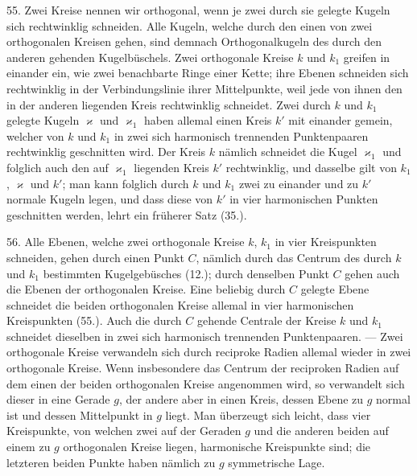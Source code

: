 55. Zwei Kreise nennen wir {\glqq}orthogonal{\grqq}, wenn je zwei
durch sie gelegte Kugeln sich rechtwinklig schneiden. Alle
Kugeln, welche durch den einen von zwei orthogonalen
Kreisen gehen, sind demnach Orthogonalkugeln des durch
den anderen gehenden Kugelb\"uschels. Zwei orthogonale
Kreise $k$ und $k_1$ greifen in einander ein, wie zwei benachbarte
Ringe einer Kette; ihre Ebenen schneiden sich rechtwinklig
in der Verbindungslinie ihrer Mittelpunkte, weil jede
von ihnen den in der anderen liegenden Kreis rechtwinklig
schneidet. Zwei durch $k$ und $k_1$ gelegte Kugeln $\varkappa$ und $\varkappa_1$
haben allemal einen Kreis $k'$ mit einander gemein, welcher
von $k$ und $k_1$ in zwei sich harmonisch trennenden Punktenpaaren
rechtwinklig geschnitten wird. Der Kreis $k$ n\"amlich
schneidet die Kugel $\varkappa_1$ und folglich auch den auf $\varkappa_1$ liegenden
Kreis $k'$ rechtwinklig, und dasselbe gilt von $k_1$, $\varkappa$ und
$k'$; man kann folglich durch $k$ und $k_1$ zwei zu einander und
zu $k'$ normale Kugeln legen, und dass diese von $k'$ in vier
harmonischen Punkten geschnitten werden, lehrt ein fr\"uherer
Satz (35.).


56. Alle Ebenen, welche zwei orthogonale Kreise $k$, $k_1$
in vier Kreispunkten schneiden, gehen durch einen Punkt $C$,
n\"amlich durch das Centrum des durch $k$ und $k_1$ bestimmten
Kugelgeb\"usches (12.); durch denselben Punkt $C$ gehen auch
die Ebenen der orthogonalen Kreise. Eine beliebig durch $C$
gelegte Ebene schneidet die beiden orthogonalen Kreise allemal
in vier harmonischen Kreispunkten (55.). Auch die
durch $C$ gehende Centrale der Kreise $k$ und $k_1$ schneidet
dieselben in zwei sich harmonisch trennenden Punktenpaaren. --- Zwei
orthogonale Kreise verwandeln sich durch
reciproke Radien allemal wieder in zwei orthogonale Kreise.
Wenn insbesondere das Centrum der reciproken Radien auf
dem einen der beiden orthogonalen Kreise angenommen wird,
so verwandelt sich dieser in eine Gerade $g$, der andere aber
in einen Kreis, dessen Ebene zu $g$ normal ist und dessen
Mittelpunkt in $g$ liegt. Man \"uberzeugt sich leicht, dass vier
Kreispunkte, von welchen zwei auf der Geraden $g$ und die
anderen beiden auf einem zu $g$ orthogonalen Kreise liegen,
harmonische Kreispunkte sind; die letzteren beiden Punkte
haben n\"amlich zu $g$ symmetrische Lage.

